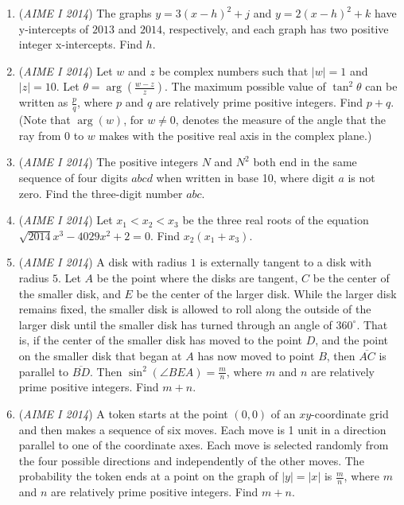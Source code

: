 \begin{enumerate}
 

	\item (\textit{AIME I 2014}) The graphs $y = 3(x-h)^2 + j$ and $y = 2(x-h)^2 + k$ have y-intercepts of $2013$ and $2014$, respectively, and each graph has two positive integer x-intercepts. Find $h$.


 

	\item (\textit{AIME I 2014}) Let $w$ and $z$ be complex numbers such that $|w| = 1$ and $|z| = 10$. Let $\theta = \arg \left(\frac{w-z}{z}\right)$. The maximum possible value of $\tan^2 \theta$ can be written as $\frac{p}{q}$, where $p$ and $q$ are relatively prime positive integers. Find $p+q$. (Note that $\arg(w)$, for $w \neq 0$, denotes the measure of the angle that the ray from $0$ to $w$ makes with the positive real axis in the complex plane.)


 

	\item (\textit{AIME I 2014}) The positive integers $N$ and $N^2$ both end in the same sequence of four digits $abcd$ when written in base 10, where digit $a$ is not zero. Find the three-digit number $abc$.


 

	\item (\textit{AIME I 2014}) Let $x_1< x_2 < x_3$ be the three real roots of the equation $\sqrt{2014} x^3 - 4029x^2 + 2 = 0$. Find $x_2(x_1+x_3)$.


 

	\item (\textit{AIME I 2014}) A disk with radius $1$ is externally tangent to a disk with radius $5$. Let $A$ be the point where the disks are tangent, $C$ be the center of the smaller disk, and $E$ be the center of the larger disk. While the larger disk remains fixed, the smaller disk is allowed to roll along the outside of the larger disk until the smaller disk has turned through an angle of $360^\circ$. That is, if the center of the smaller disk has moved to the point $D$, and the point on the smaller disk that began at $A$ has now moved to point $B$, then $\overline{AC}$ is parallel to $\overline{BD}$. Then $\sin^2(\angle BEA)=\frac{m}{n}$, where $m$ and $n$ are relatively prime positive integers. Find $m+n$.


 

	\item (\textit{AIME I 2014}) A token starts at the point $(0,0)$ of an $xy$-coordinate grid and then makes a sequence of six moves. Each move is 1 unit in a direction parallel to one of the coordinate axes. Each move is selected randomly from the four possible directions and independently of the other moves. The probability the token ends at a point on the graph of $|y|=|x|$ is $\frac{m}{n}$, where $m$ and $n$ are relatively prime positive integers. Find $m+n$.



\end{enumerate}
